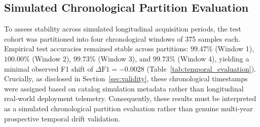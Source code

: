 \documentclass[pdflatex,sn-mathphys-num]{sn-jnl}
\begin{document}
\begin{tableorg}[t]
\centering
\caption{Single-family WannaCry holdout and family-stratified test cohort breakdown ($N = 744$ malware test binaries).}\label{tab:family_holdout}
\end{tableorg}

\subsection{Simulated Chronological Partition Evaluation}\label{sec:gen_temporal}
To assess stability across simulated longitudinal acquisition periods, the test cohort was partitioned into four chronological windows of 375 samples each. Empirical test accuracies remained stable across partitions: $99.47\%$ (Window 1), $100.00\%$ (Window 2), $99.73\%$ (Window 3), and $99.73\%$ (Window 4), yielding a minimal observed F1 shift of $\Delta\text{F1} = -0.0028$ (Table~\ref{tab:temporal_evaluation}). Crucially, as disclosed in Section~\ref{sec:validity}, these chronological timestamps were assigned based on catalog simulation metadata rather than longitudinal real-world deployment telemetry. Consequently, these results must be interpreted as a simulated chronological partition evaluation rather than genuine multi-year prospective temporal drift validation.
\end{document}

